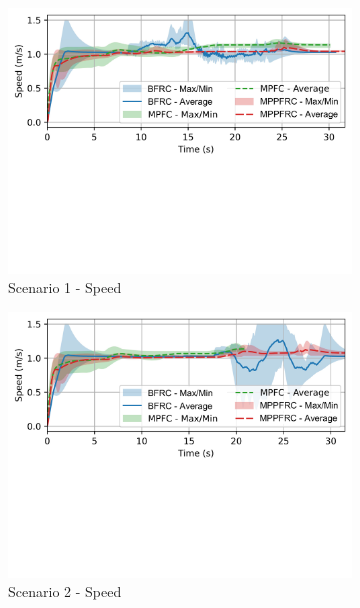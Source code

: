 \begin{figure}[h!]
    \centering
    \begin{subfigure}[b]{0.495\textwidth}
    \includegraphics[width=\textwidth]{paper3/images/velocity_scen1.pdf}
    \caption{Scenario 1 - Speed}
    \label{fig:speed1}
    \end{subfigure}
    \begin{subfigure}[b]{0.495\textwidth}
    \includegraphics[width=\textwidth]{paper3/images/velocity_scen2.pdf}
    \caption{Scenario 2 - Speed}
    \label{fig:speed2}
    \end{subfigure}
    \begin{subfigure}[b]{0.495\textwidth}

\end{subfigure}
\end{figure}
